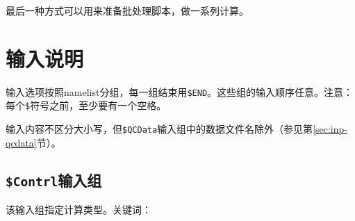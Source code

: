 \documentclass[12pt,a4paper,openany,twoside,cap,UTF8]{ctexbook}
\begin{document}
最后一种方式可以用来准备批处理脚本，做一系列计算。


\chapter{输入说明} \label{part:input}

输入选项按照namelist分组，每一组结束用\verb|$END|。这些组的输入顺序任意。注意：每个\verb|$|符号之前，至少要有一个空格。

输入内容不区分大小写，但\verb|$QCData|输入组中的数据文件名除外（参见第\ref{sec:inp-qcdata}节）。

\section{\texttt{\$Contrl}输入组} \label{sec:inp-contrl}

该输入组指定计算类型。关键词：
\end{document}
